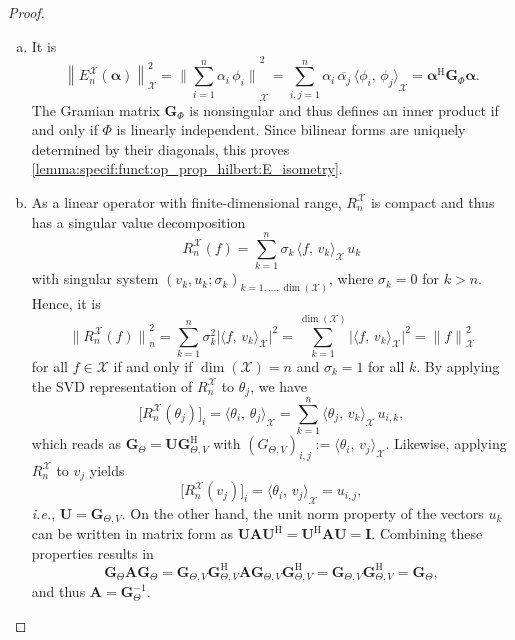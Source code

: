 \documentclass[a4paper]{paper}
\newcommand{\Spc}[1]{\mathscr{#1}}
\newcommand*{\EXT}[2]{\ensuremath{E_{#1}^{#2}}}
\newcommand*{\REST}[2]{\ensuremath{R_{#1}^{#2}}}
\newcommand*{\RnX}{\ensuremath{\REST{n}{\Spc{X}}}}
\newcommand*{\EnX}{\ensuremath{\EXT{n}{\Spc{X}}}}
\DeclareMathOperator{\DIM}{dim}
\newcommand*{\ABSbig}[1]{\ensuremath{\big\lvert#1\rvert}}
\newcommand*{\NORM}[1]{\ensuremath{\lVert #1 \rVert}}
\newcommand*{\NORMbig}[1]{\ensuremath{\big\lVert #1 \big\rVert}}
\newcommand*{\NORMBig}[1]{\ensuremath{\Big\lVert #1 \Big\rVert}}
\newcommand*{\NORMLR}[1]{\ensuremath{\left\lVert #1 \right\rVert}}
\newcommand*{\INNER}[2]{\ensuremath{\langle #1,\,#2\rangle}}
\newcommand*{\HERM}[1]{{\ensuremath{#1^{\mathrm{H}}}}}
\newcommand{\ie}{\textsl{i.e.}\xspace}
\newcommand{\valpha}{\boldsymbol{\alpha}}
\newcommand{\vA}{\boldsymbol{A}}
\newcommand{\vG}{\boldsymbol{G}}
\newcommand{\vI}{\boldsymbol{I}}
\newcommand{\vU}{\boldsymbol{U}}
\begin{document}
\begin{proof}
\begin{enumerate}[(a)]
  \item It is
  \begin{equation*}
   \NORMLR{\EnX(\valpha)}_{\Spc{X}}^2 = \NORMBig{\sum_{i=1}^n \alpha_i\, \phi_i}_{\Spc{X}}^2 = 
   \sum_{i,j=1}^n \alpha_i\, \overline{\alpha_j}\, \INNER{\phi_i}{\phi_j}_{\Spc{X}} = \HERM{\valpha} \vG_\Phi \valpha.
  \end{equation*}
  The Gramian matrix $\vG_\Phi$ is nonsingular and thus defines an inner product if and only if $\Phi$ is linearly 
  independent. Since bilinear forms are uniquely determined by their diagonals, this proves 
  \eqref{lemma:specif:funct:op_prop_hilbert:E_isometry}.
  
  \item As a linear operator with finite-dimensional range, $\RnX$ is compact and thus has a singular value 
  decomposition
  \begin{equation*}
   \RnX(f) = \sum_{k=1}^n \sigma_k\, \INNER{f}{v_k}_{\Spc{X}}\, u_k
  \end{equation*}
  with singular system $(v_k, u_k; \sigma_k)_{k=1, \ldots, \DIM(\Spc{X})}$, where $\sigma_k = 0$ for $k > n$. Hence, it 
  is
  \begin{equation*}
   \NORMbig{\RnX(f)}_n^2 = \sum_{k=1}^n \sigma_k^2 \ABSbig{\INNER{f}{v_k}_{\Spc{X}}}^2 
   = \sum_{k=1}^{\DIM(\Spc{X})} \ABSbig{\INNER{f}{v_k}_{\Spc{X}}}^2 = \NORM{f}_{\Spc{X}}^2
  \end{equation*}
  for all $f\in\Spc{X}$ if and only if $\DIM(\Spc{X}) = n$ and $\sigma_k = 1$ for all $k$. By applying the SVD
  representation of $\RnX$ to $\theta_j$, we have
  \begin{equation*}
   \big[ \RnX(\theta_j) \big]_i = \INNER{\theta_i}{\theta_j}_{\Spc{X}} = \sum_{k=1}^n \INNER{\theta_j}{v_k}_{\Spc{X}}\, 
   u_{i,k},
  \end{equation*}
  which reads as $\vG_\Theta = \vU \HERM{\vG_{\Theta,V}}$ with 
  $(G_{\Theta,V})_{i,j} := \INNER{\theta_i}{v_j}_{\Spc{X}}$. Likewise, applying $\RnX$ to $v_j$ yields
  \begin{equation*}
   \big[ \RnX(v_j) \big]_i = \INNER{\theta_i}{v_j}_{\Spc{X}} = u_{i,j},
  \end{equation*}
  \ie, $\vU = \vG_{\Theta,V}$. On the other hand, the unit norm property of the vectors $u_k$ can be written in matrix 
  form as $\vU \vA \HERM{\vU} = \HERM{\vU} \vA \vU = \vI$. Combining these properties results in
  \begin{equation*}
   \vG_\Theta \vA \vG_\Theta = \vG_{\Theta,V} \HERM{\vG_{\Theta,V}} \vA \vG_{\Theta,V} \HERM{\vG_{\Theta,V}}
   = \vG_{\Theta,V} \HERM{\vG_{\Theta,V}} = \vG_\Theta,
  \end{equation*}
  and thus $\vA = \vG_\Theta^{-1}$.
 \end{enumerate}
\end{proof}
\end{document}
